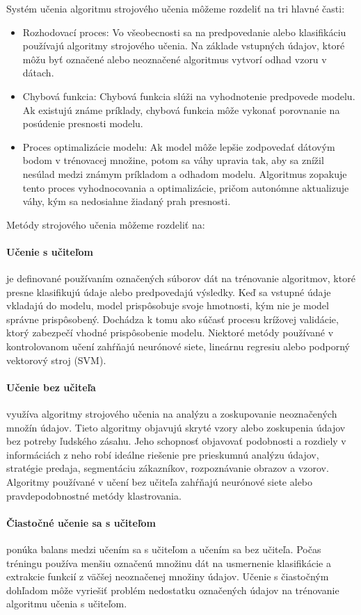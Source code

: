 Systém učenia algoritmu strojového učenia môžeme rozdeliť na tri hlavné časti:
\begin{itemize}
    \item Rozhodovací proces: Vo všeobecnosti sa na predpovedanie alebo klasifikáciu používajú algoritmy strojového učenia. Na základe vstupných údajov, ktoré môžu byť označené alebo neoznačené algoritmus vytvorí odhad vzoru v dátach.
    \item Chybová funkcia: Chybová funkcia slúži na vyhodnotenie predpovede modelu. Ak existujú známe príklady, chybová funkcia môže vykonať porovnanie na posúdenie presnosti modelu.
    \item Proces optimalizácie modelu: Ak model môže lepšie zodpovedať dátovým bodom v trénovacej množine, potom sa váhy upravia tak, aby sa znížil nesúlad medzi známym príkladom a odhadom modelu. Algoritmus zopakuje tento proces vyhodnocovania a optimalizácie, pričom autonómne aktualizuje váhy, kým sa nedosiahne žiadaný prah presnosti.
\end{itemize}

Metódy strojového učenia môžeme rozdeliť na:
\paragraph{Učenie s učiteľom} je definované používaním označených súborov dát na trénovanie algoritmov, ktoré presne klasifikujú údaje alebo predpovedajú výsledky. Keď sa vstupné údaje vkladajú do modelu, model prispôsobuje svoje hmotnosti, kým nie je model správne prispôsobený. Dochádza k tomu ako súčasť procesu krížovej validácie, ktorý zabezpečí vhodné prispôsobenie modelu. Niektoré metódy používané v kontrolovanom učení zahŕňajú neurónové siete, lineárnu regresiu alebo podporný vektorový stroj (SVM).

\paragraph{Učenie bez učiteľa} využíva algoritmy strojového učenia na analýzu a zoskupovanie neoznačených množín údajov. Tieto algoritmy objavujú skryté vzory alebo zoskupenia údajov bez potreby ľudského zásahu. Jeho schopnosť objavovať podobnosti a rozdiely v informáciách z neho robí ideálne riešenie pre prieskumnú analýzu údajov, stratégie predaja, segmentáciu zákazníkov, rozpoznávanie obrazov a vzorov. Algoritmy používané v učení bez učiteľa zahŕňajú neurónové siete alebo pravdepodobnostné metódy klastrovania.

\paragraph{Čiastočné učenie sa s učiteľom} ponúka balans medzi učením sa s učiteľom a učením sa bez učiteľa. Počas tréningu používa menšiu označenú množinu dát na usmernenie klasifikácie a extrakcie funkcií z väčšej neoznačenej množiny údajov. Učenie s čiastočným dohľadom môže vyriešiť problém nedostatku označených údajov na trénovanie algoritmu učenia s učiteľom.

